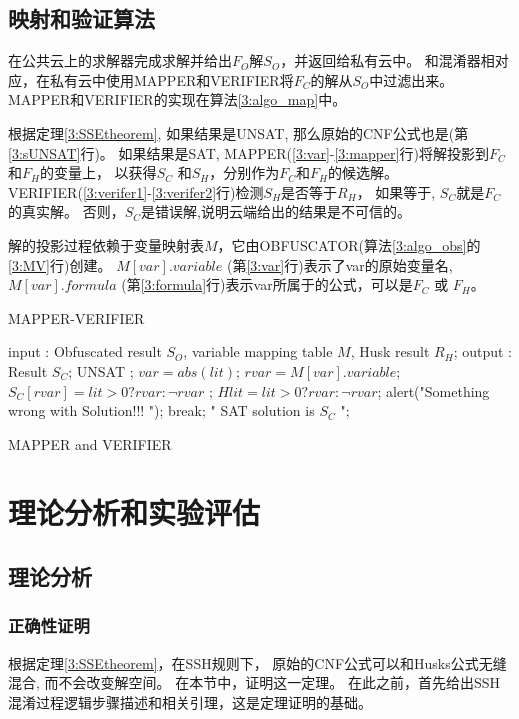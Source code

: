 \subsection{映射和验证算法}\label{3:mappping}
在公共云上的求解器完成求解并给出$F_O$解$S_O$，并返回给私有云中。
和混淆器相对应，在私有云中使用MAPPER和VERIFIER将$F_C$的解从$S_O$中过滤出来。
MAPPER和VERIFIER的实现在算法\ref{3:algo_map}中。

根据定理\ref{3:SSEtheorem},
如果结果是UNSAT, 那么原始的CNF公式也是(第\ref{3:sUNSAT}行)。
如果结果是SAT, MAPPER(\ref{3:var}-\ref{3:mapper}行)将解投影到$F_C$和$F_H$的变量上，
以获得$S_C$ 和$S_H$，分别作为$F_C$和$F_H$的候选解。
VERIFIER(\ref{3:verifer1}-\ref{3:verifer2}行)检测$S_H$是否等于$R_H$，
如果等于, $S_C$就是$F_C$的真实解。
否则，$S_C$是错误解,说明云端给出的结果是不可信的。

解的投影过程依赖于变量映射表$M$，它由OBFUSCATOR(算法\ref{3:algo_obs}的\ref{3:MV}行)创建。
$M[var].variable$ (第\ref{3:var}行)表示了var的原始变量名,
$M[var].formula$ (第\ref{3:formula}行)表示var所属于的公式，可以是$F_C$ 或 $F_H$。


\begin{algorithm}[t]
\caption{MAPPER-VERIFIER}
\label{3:algo_map}
\begin{algorithmic}[1]
\STATE input : Obfuscated result $S_O$, variable mapping table $M$, Husk result $R_H$;
\STATE output : Result $S_C$;
 \label{3:sUNSAT}
\RETURN UNSAT ;
\ENDIF
{}
\STATE $var=abs(lit)$;
\STATE $rvar=M[var].variable $;\label{3:var}
  \label{3:formula}
\STATE $S_C[rvar]=lit>0?rvar:\neg rvar$ ; \label{3:mapper}
\ELSE
\STATE $Hlit=lit>0?rvar:\neg rvar$;\label{3:verifer1}
\STATE    alert("Something wrong with Solution!!! "); \label{3:Warning}
\STATE    break;
\ENDIF
\ENDIF
\label{3:verifer2}
\ENDFOR
\PRINT " SAT  solution is $S_C$ ";
\caption{MAPPER and VERIFIER}
\end{algorithmic}
\end{algorithm}
\section{理论分析和实验评估}
\subsection{理论分析}
\subsubsection{正确性证明}\label{3:correctness}
根据定理\ref{3:SSEtheorem}，在SSH规则下，
原始的CNF公式可以和Husks公式无缝混合, 而不会改变解空间。
在本节中，证明这一定理。
在此之前，首先给出SSH混淆过程逻辑步骤描述和相关引理，这是定理证明的基础。

